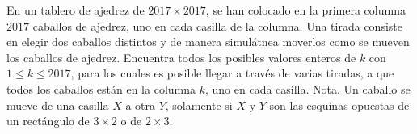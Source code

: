En un tablero de ajedrez de $2017 \times 2017$, se han colocado en la primera columna $2017$
caballos de ajedrez, uno en cada casilla de la columna. Una tirada consiste en elegir dos
caballos distintos y de manera simulátnea moverlos como se mueven los caballos de ajedrez.
Encuentra todos los posibles valores enteros de $k$ con $1 \leq k \leq 2017$, para los cuales es
posible llegar a través de varias tiradas, a que todos los caballos están en la columna $k$, uno
en cada casilla.
Nota. Un caballo se mueve de una casilla $X$ a otra $Y$, solamente si $X$ y $Y$ son las esquinas
opuestas de un rectángulo de $3 \times 2$ o de $2 \times 3$.